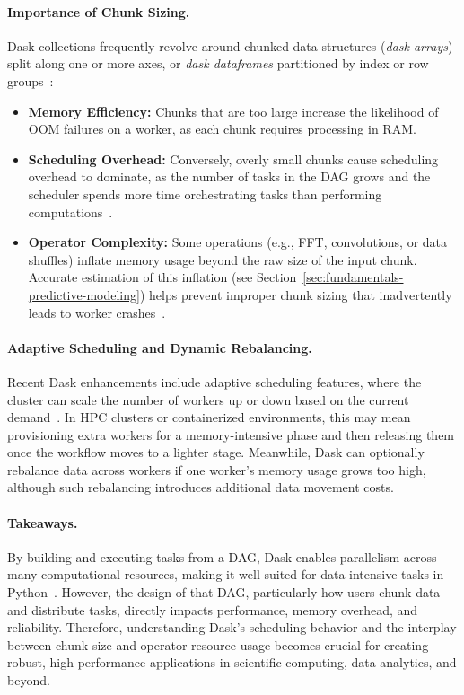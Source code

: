 \paragraph{Importance of Chunk Sizing.}
Dask collections frequently revolve around chunked data structures (\textit{dask arrays}) split along one or more axes, or \textit{dask dataframes} partitioned by index or row groups~\cite{rocklin2015dask}:
\begin{itemize}
    \item \textbf{Memory Efficiency:} Chunks that are too large increase the likelihood of \ac{OOM} failures on a worker, as each chunk requires processing in \ac{RAM}.
    \item \textbf{Scheduling Overhead:} Conversely, overly small chunks cause scheduling overhead to dominate, as the number of tasks in the \ac{DAG} grows and the scheduler spends more time orchestrating tasks than performing computations~\cite{Dean2004}.
    \item \textbf{Operator Complexity:} Some operations (e.g., \ac{FFT}, convolutions, or data shuffles) inflate memory usage beyond the raw size of the input chunk. Accurate estimation of this inflation (see Section~\ref{sec:fundamentals-predictive-modeling}) helps prevent improper chunk sizing that inadvertently leads to worker crashes~\cite{Bader2024}.
\end{itemize}

\paragraph{Adaptive Scheduling and Dynamic Rebalancing.}
Recent Dask enhancements include adaptive scheduling features, where the cluster can scale the number of workers up or down based on the current demand~\cite{rocklin2015dask}.
In \ac{HPC} clusters or containerized environments, this may mean provisioning extra workers for a memory-intensive phase and then releasing them once the workflow moves to a lighter stage.
Meanwhile, Dask can optionally rebalance data across workers if one worker's memory usage grows too high, although such rebalancing introduces additional data movement costs.

\paragraph{Takeaways.}
By building and executing tasks from a \ac{DAG}, Dask enables parallelism across many computational resources, making it well-suited for data-intensive tasks in Python~\cite{rocklin2015dask}.
However, the design of that \ac{DAG}, particularly how users chunk data and distribute tasks, directly impacts performance, memory overhead, and reliability.
Therefore, understanding Dask's scheduling behavior and the interplay between chunk size and operator resource usage becomes crucial for creating robust, high-performance applications in scientific computing, data analytics, and beyond.


